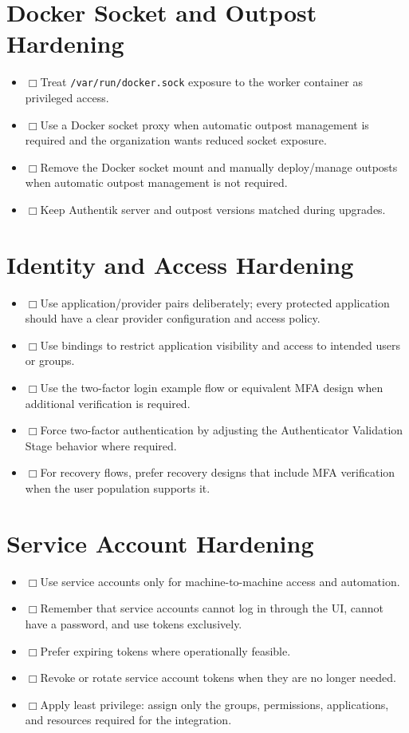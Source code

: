 \documentclass[11pt]{article}
\newcommand{\checkbox}{$\Box$\hspace{0.4em}}
\begin{document}
\section*{Docker Socket and Outpost Hardening}
\begin{itemize}
\item \checkbox Treat \texttt{/var/run/docker.sock} exposure to the worker container as privileged access.
\item \checkbox Use a Docker socket proxy when automatic outpost management is required and the organization wants reduced socket exposure.
\item \checkbox Remove the Docker socket mount and manually deploy/manage outposts when automatic outpost management is not required.
\item \checkbox Keep Authentik server and outpost versions matched during upgrades.
\end{itemize}

\section*{Identity and Access Hardening}
\begin{itemize}
\item \checkbox Use application/provider pairs deliberately; every protected application should have a clear provider configuration and access policy.
\item \checkbox Use bindings to restrict application visibility and access to intended users or groups.
\item \checkbox Use the two-factor login example flow or equivalent MFA design when additional verification is required.
\item \checkbox Force two-factor authentication by adjusting the Authenticator Validation Stage behavior where required.
\item \checkbox For recovery flows, prefer recovery designs that include MFA verification when the user population supports it.
\end{itemize}

\section*{Service Account Hardening}
\begin{itemize}
\item \checkbox Use service accounts only for machine-to-machine access and automation.
\item \checkbox Remember that service accounts cannot log in through the UI, cannot have a password, and use tokens exclusively.
\item \checkbox Prefer expiring tokens where operationally feasible.
\item \checkbox Revoke or rotate service account tokens when they are no longer needed.
\item \checkbox Apply least privilege: assign only the groups, permissions, applications, and resources required for the integration.
\end{itemize}
\end{document}
